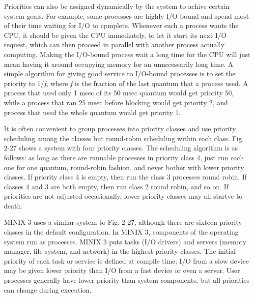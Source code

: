 \documentclass{book}
\newcommand {\sys} [1] {\textsl{#1}}
\begin{document}
Priorities can also be assigned dynamically by the system to achive certain system goals.
For example, some processes are highly I/O bound and spend most of their time waiting for I/O to cpmplete.
Whenever such a process wants the CPU, it should be given the CPU immediately, to let it start its next I/O request, 
which can then proceed in parallel with another process actually computing.
Making the I/O-bound process wait a long time for the CPU will just mean having it around occupying memory for an unnecessarily long time.
A simple algorithm for giving good service to I/O-bound processes is to set the priority to 1/\sys{f}, 
where \sys{f} is the fraction of the last quantum that a process used.
A process that used only 1 msec of its 50 msec quantum would get priority 50, 
while a process that ran 25 msec before blocking would get priority 2,
and process that used the whole quantum would get priority 1.

It is often convenient to group processes into priority classes and 
use priority scheduling among the classes but round-robin scheduling within each class.
Fig. 2-27 shows a system with four priority classes.
The scheduling algorithm is as follows: as long as there are runnable processes in priority class 4, 
just run each one for one quantum, round-robin fashion, and never bother with lower priority classes.
If priority class 4 is empty, then run the class 3 processes round robin.
If classes 4 and 3 are both empty, then run class 2 round robin, and so on.
If priorities are not adjusted occasionally, lower priority classes may all startve to death.

MINIX 3 uses a similar system to Fig. 2-27, although there are sixteen priority classes in the default configuration.
In MINIX 3, components of the operating system run as processes.
MINIX 3 puts tasks (I/O drivers) and servers (memory manager, file system, and network) in the highest priority classes.
The initial priority of each task or service is defined at compile time;
I/O from a slow device may be given lower priority than I/O from a fast device or even a server.
User processes generally have lower priority than system components, but all priorities can change during execution.
\end{document}
